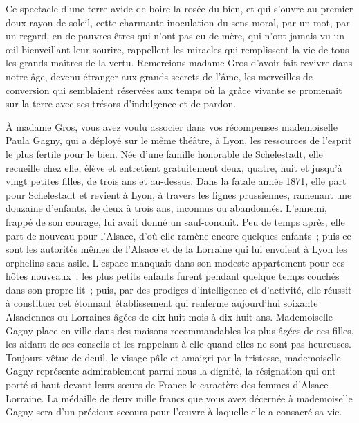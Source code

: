 \documentclass[french,twoside]{book} %
\newcommand\persName[1]{#1}
\newcommand\placeName[1]{#1}
\begin{document}
Ce spectacle d’une terre avide de boire la rosée du bien, et qui s’ouvre au premier doux rayon de soleil, cette charmante inoculation du sens moral, par un mot, par un regard, en de pauvres êtres qui n’ont pas eu de mère, qui n’ont jamais vu un œil bienveillant leur sourire, rappellent les miracles qui remplissent la vie de tous les grands maîtres de la vertu. Remercions {\persName madame Gros} d’avoir fait revivre dans notre âge, devenu étranger aux grands secrets de l’âme, les merveilles de conversion qui semblaient réservées aux temps où la grâce vivante se promenait sur la terre avec ses trésors d’indulgence et de pardon.\par
À {\persName madame Gros}, vous avez voulu associer dans vos récompenses {\persName mademoiselle Paula Gagny}, qui a déployé sur le même théâtre, à {\placeName Lyon}, les ressources de l’esprit le plus fertile pour le bien. Née d’une famille honorable de Schelestadt, elle recueille chez elle, élève et entretient gratuitement deux, quatre, huit et jusqu’à vingt petites filles, de trois ans et au-dessus. Dans la fatale année 1871, elle part pour {\placeName Schelestadt} et revient à {\placeName Lyon}, à travers les lignes prussiennes, ramenant une douzaine d’enfants, de deux à trois ans, inconnus ou abandonnés. L’ennemi, frappé de son courage, lui avait donné un sauf-conduit. Peu de temps après, elle part de nouveau pour l’{\placeName Alsace}, d’où elle ramène encore quelques enfants ; puis ce sont les autorités mêmes de l’{\placeName Alsace} et de la {\placeName Lorraine} qui lui envoient à {\placeName Lyon} les orphelins sans asile. L’espace manquait dans son modeste appartement pour ces hôtes nouveaux ; les plus petits enfants furent pendant quelque temps couchés dans son propre lit ; puis, par des prodiges d’intelligence et d’activité, elle réussit à constituer cet étonnant établissement qui renferme aujourd’hui soixante Alsaciennes ou Lorraines âgées de dix-huit mois à dix-huit ans. {\persName Mademoiselle Gagny} place en ville dans des maisons recommandables les plus âgées de ces filles, les aidant de ses conseils et les rappelant à elle quand elles ne sont pas heureuses. Toujours vêtue de deuil, le visage pâle et amaigri par la tristesse, {\persName mademoiselle Gagny} représente admirablement parmi nous la dignité, la résignation qui ont porté si haut devant leurs sœurs de {\placeName France} le caractère des femmes d’{\placeName Alsace-Lorraine}. La médaille de deux mille francs que vous avez décernée à {\persName mademoiselle Gagny} sera d’un précieux secours pour l’œuvre à laquelle elle a consacré sa vie.\par
\end{document}
